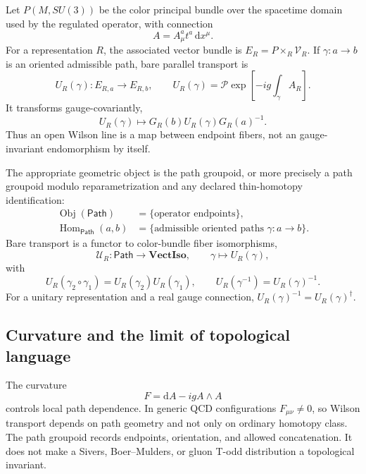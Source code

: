 \documentclass[11pt]{article}
\newcommand{\dd}{\mathrm{d}}
\newcommand{\Hom}{\operatorname{Hom}}
\newcommand{\Obj}{\operatorname{Obj}}
\newcommand{\Rep}{\mathcal V}
\newcommand{\Path}{\mathsf{Path}}
\begin{document}
Let \(P(M,SU(3))\) be the color principal bundle over the spacetime domain
used by the regulated operator, with connection
\begin{equation}
 A=A_\mu^a t^a\,\dd x^\mu.
\end{equation}
For a representation \(R\), the associated vector bundle is
\(E_R=P\times_R\Rep_R\).  If \(\gamma:a\to b\) is an oriented admissible
path, bare parallel transport is
\begin{equation}
 U_R(\gamma):E_{R,a}\longrightarrow E_{R,b},
 \qquad
 U_R(\gamma)
 =\mathcal P\exp\left[-ig\int_\gamma A_R\right].
\label{eq:bare-holonomy}
\end{equation}
It transforms gauge-covariantly,
\begin{equation}
 U_R(\gamma)\longmapsto
 G_R(b)U_R(\gamma)G_R(a)^{-1}.
\label{eq:holonomy-gauge-transform}
\end{equation}
Thus an open Wilson line is a map between endpoint fibers, not an
gauge-invariant endomorphism by itself.

The appropriate geometric object is the path groupoid, or more precisely a
path groupoid modulo reparametrization and any declared thin-homotopy
identification:
\begin{align}
 \Obj(\Path)&=\{\text{operator endpoints}\},\\
 \Hom_{\Path}(a,b)&=\{\text{admissible oriented paths }\gamma:a\to b\}.
\end{align}
Bare transport is a functor to color-bundle fiber isomorphisms,
\begin{equation}
 \mathcal U_R:\Path\longrightarrow\mathbf{VectIso},
 \qquad
 \gamma\longmapsto U_R(\gamma),
\label{eq:path-functor}
\end{equation}
with
\begin{equation}
 U_R(\gamma_2\circ\gamma_1)
 =U_R(\gamma_2)U_R(\gamma_1),
 \qquad
 U_R(\gamma^{-1})=U_R(\gamma)^{-1}.
\label{eq:bare-path-composition}
\end{equation}
For a unitary representation and a real gauge connection,
\(U_R(\gamma)^{-1}=U_R(\gamma)^\dagger\).

\subsection{Curvature and the limit of topological language}

The curvature
\begin{equation}
 F=\dd A-igA\wedge A
\label{eq:gauge-curvature}
\end{equation}
controls local path dependence.  In generic QCD configurations
\(F_{\mu\nu}\neq0\), so Wilson transport depends on path geometry and not
only on ordinary homotopy class.  The path groupoid records endpoints,
orientation, and allowed concatenation.  It does not make a Sivers,
Boer--Mulders, or gluon T-odd distribution a topological invariant.
\end{document}
